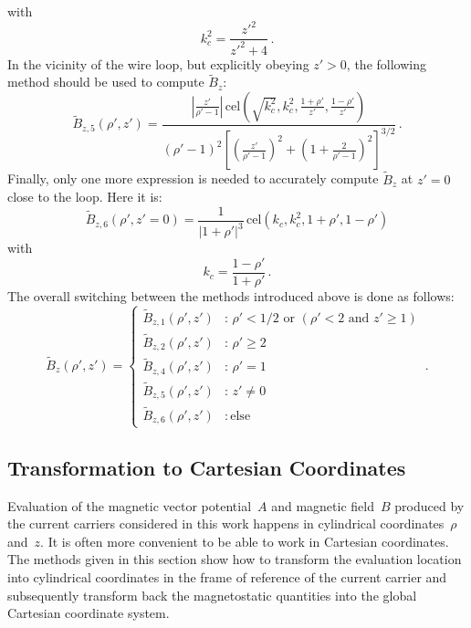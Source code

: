 with
\begin{equation}
  k_c^2 = \frac{{z'}^2}{{z'}^2 + 4} \, .
\end{equation}
In the vicinity of the wire loop, but explicitly obeying $z' > 0$,
the following method should be used to compute $\tilde{B}_z$:
\begin{equation}
  \tilde{B}_{z,5} (\rho', z')
  = \frac{\left| \frac{z'}{\rho' - 1} \right| \,\mathrm{cel}\left( \sqrt{k_c^2}, k_c^2, \frac{1 + \rho'}{z'}, \frac{1 - \rho'}{z'} \right) }
         {\left(\rho' - 1 \right)^2 \left[ \left( \frac{z'}{\rho'-1} \right)^2 + \left(1 + \frac{2}{\rho'-1} \right)^2 \right]^{3/2} } \, .
\end{equation}
Finally, only one more expression is needed to accurately compute $\tilde{B}_z$ at $z'=0$ close to the loop.
Here it is:
\begin{equation}
  \tilde{B}_{z,6} (\rho', z'=0)
  = \frac{1}{|1 + \rho'|^3}
    \,\mathrm{cel}(k_c, k_c^2, 1+\rho', 1-\rho')
\end{equation}
with
\begin{equation}
  k_c = \frac{1-\rho'}{1+\rho'} \, .
\end{equation}
%
%
The overall switching between the methods introduced above is done as follows:
\begin{equation}
  \tilde{B}_z(\rho', z')
  = \begin{cases}
      \tilde{B}_{z,1} (\rho', z') &:\, \rho' < 1/2 \textrm{ or } (\rho' < 2 \textrm{ and } z' \geq 1) \\
      \tilde{B}_{z,2} (\rho', z') &:\, \rho' \geq 2 \\
      \tilde{B}_{z,4} (\rho', z') &:\, \rho' = 1 \\
      \tilde{B}_{z,5} (\rho', z') &:\, z' \neq 0 \\
      \tilde{B}_{z,6} (\rho', z') &:\, \textrm{else}
    \end{cases} \, .
\end{equation}





\subsection{Transformation to Cartesian Coordinates}
Evaluation of the magnetic vector potential~$A$ and magnetic field~$B$
produced by the current carriers considered in this work
happens in cylindrical coordinates~$\rho$ and~$z$.
It is often more convenient to be able to work in Cartesian coordinates.
The methods given in this section show how to transform the evaluation location
into cylindrical coordinates in the frame of reference of the current carrier
and subsequently transform back the magnetostatic quantities into the global Cartesian coordinate system.

